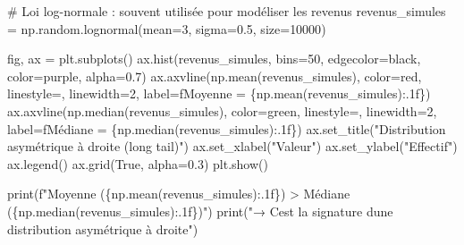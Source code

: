 \documentclass[
  french,
  11pt,
  a4paper,
]{scrbook}
\newenvironment{Shaded}{}{}
\newcommand{\BuiltInTok}[1]{\textcolor[rgb]{0.84,0.23,0.29}{#1}}
\newcommand{\CommentTok}[1]{\textcolor[rgb]{0.42,0.45,0.49}{#1}}
\newcommand{\DecValTok}[1]{\textcolor[rgb]{0.00,0.36,0.77}{#1}}
\newcommand{\FloatTok}[1]{\textcolor[rgb]{0.00,0.36,0.77}{#1}}
\newcommand{\NormalTok}[1]{\textcolor[rgb]{0.14,0.16,0.18}{#1}}
\newcommand{\OperatorTok}[1]{\textcolor[rgb]{0.14,0.16,0.18}{#1}}
\newcommand{\SpecialCharTok}[1]{\textcolor[rgb]{0.00,0.36,0.77}{#1}}
\newcommand{\SpecialStringTok}[1]{\textcolor[rgb]{0.01,0.18,0.38}{#1}}
\newcommand{\StringTok}[1]{\textcolor[rgb]{0.01,0.18,0.38}{#1}}
\newcommand{\VariableTok}[1]{\textcolor[rgb]{0.89,0.38,0.04}{#1}}
\begin{document}
\begin{Shaded}
\begin{Highlighting}[]
\CommentTok{\# Loi log{-}normale : souvent utilisée pour modéliser les revenus}
\NormalTok{revenus\_simules }\OperatorTok{=}\NormalTok{ np.random.lognormal(mean}\OperatorTok{=}\DecValTok{3}\NormalTok{, sigma}\OperatorTok{=}\FloatTok{0.5}\NormalTok{, size}\OperatorTok{=}\DecValTok{10000}\NormalTok{)}

\NormalTok{fig, ax }\OperatorTok{=}\NormalTok{ plt.subplots()}
\NormalTok{ax.hist(revenus\_simules, bins}\OperatorTok{=}\DecValTok{50}\NormalTok{, edgecolor}\OperatorTok{=}\StringTok{\textquotesingle{}black\textquotesingle{}}\NormalTok{, color}\OperatorTok{=}\StringTok{\textquotesingle{}purple\textquotesingle{}}\NormalTok{, alpha}\OperatorTok{=}\FloatTok{0.7}\NormalTok{)}
\NormalTok{ax.axvline(np.mean(revenus\_simules), color}\OperatorTok{=}\StringTok{\textquotesingle{}red\textquotesingle{}}\NormalTok{, linestyle}\OperatorTok{=}\StringTok{\textquotesingle{}{-}{-}\textquotesingle{}}\NormalTok{, }
\NormalTok{           linewidth}\OperatorTok{=}\DecValTok{2}\NormalTok{, label}\OperatorTok{=}\SpecialStringTok{f\textquotesingle{}Moyenne = }\SpecialCharTok{\{}\NormalTok{np}\SpecialCharTok{.}\NormalTok{mean(revenus\_simules)}\SpecialCharTok{:.1f\}}\SpecialStringTok{\textquotesingle{}}\NormalTok{)}
\NormalTok{ax.axvline(np.median(revenus\_simules), color}\OperatorTok{=}\StringTok{\textquotesingle{}green\textquotesingle{}}\NormalTok{, linestyle}\OperatorTok{=}\StringTok{\textquotesingle{}{-}{-}\textquotesingle{}}\NormalTok{, }
\NormalTok{           linewidth}\OperatorTok{=}\DecValTok{2}\NormalTok{, label}\OperatorTok{=}\SpecialStringTok{f\textquotesingle{}Médiane = }\SpecialCharTok{\{}\NormalTok{np}\SpecialCharTok{.}\NormalTok{median(revenus\_simules)}\SpecialCharTok{:.1f\}}\SpecialStringTok{\textquotesingle{}}\NormalTok{)}
\NormalTok{ax.set\_title(}\StringTok{"Distribution asymétrique à droite (long tail)"}\NormalTok{)}
\NormalTok{ax.set\_xlabel(}\StringTok{"Valeur"}\NormalTok{)}
\NormalTok{ax.set\_ylabel(}\StringTok{"Effectif"}\NormalTok{)}
\NormalTok{ax.legend()}
\NormalTok{ax.grid(}\VariableTok{True}\NormalTok{, alpha}\OperatorTok{=}\FloatTok{0.3}\NormalTok{)}
\NormalTok{plt.show()}

\BuiltInTok{print}\NormalTok{(}\SpecialStringTok{f"Moyenne (}\SpecialCharTok{\{}\NormalTok{np}\SpecialCharTok{.}\NormalTok{mean(revenus\_simules)}\SpecialCharTok{:.1f\}}\SpecialStringTok{) \textgreater{} Médiane (}\SpecialCharTok{\{}\NormalTok{np}\SpecialCharTok{.}\NormalTok{median(revenus\_simules)}\SpecialCharTok{:.1f\}}\SpecialStringTok{)"}\NormalTok{)}
\BuiltInTok{print}\NormalTok{(}\StringTok{"→ C\textquotesingle{}est la signature d\textquotesingle{}une distribution asymétrique à droite"}\NormalTok{)}
\end{Highlighting}
\end{Shaded}
\end{document}
